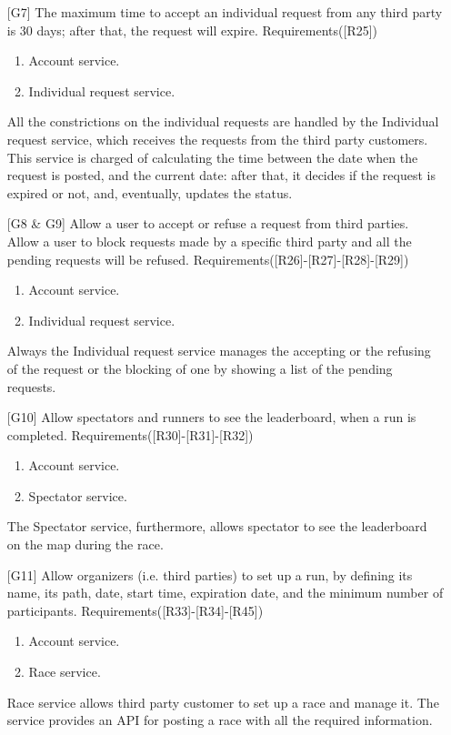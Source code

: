 \begin{itemize}
\item[{[G7]}] The maximum time to accept an individual request from any third party is 30 days; after that, the request will expire. Requirements([R25])
	\begin{enumerate}
	\item Account service.
	\item Individual request service.
	\end{enumerate}
All the constrictions on the individual requests are handled by the Individual request service, which receives the requests from the third
party customers. 
This service is charged of calculating the time between the date when the request is posted, and the current date: after that, it decides if
the request is expired or not, and, eventually, updates the status.

\item[{[G8 \& G9]}] Allow a user to accept or refuse a request from third parties. Allow a user to block requests made by a specific third party and all the pending requests will be refused. Requirements([R26]-[R27]-[R28]-[R29])
	\begin{enumerate}
	\item Account service.
	\item Individual request service.
	\end{enumerate}
Always the Individual request service manages the accepting or the refusing of the request or the blocking of one by showing a list of the pending requests. 	
	
\item[{[G10]}] Allow spectators and runners to see the leaderboard, when a run is completed. Requirements([R30]-[R31]-[R32])
	\begin{enumerate}
	\item Account service.
	\item Spectator service.
	\end{enumerate}
The Spectator service, furthermore, allows spectator to see the leaderboard on the map during the race. 
	
\item[{[G11]}] Allow organizers (i.e. third parties) to set up a run, by defining its name, its path, date, start time, expiration date, and the minimum number of participants. Requirements([R33]-[R34]-[R45])
	\begin{enumerate}
	\item Account service.
	\item Race service.
	\end{enumerate}
Race service allows third party customer to set up a race and manage it. The service provides an API for posting a race with all the required information.
	

\end{itemize}
